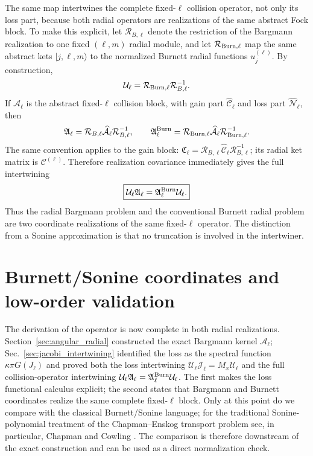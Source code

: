 \documentclass[11pt]{article}
\numberwithin{equation}{section}
\theoremstyle{definition}
\begin{document}
The same map intertwines the complete fixed-$\ell$ collision operator, not
only its loss part, because both radial operators are realizations of the same
abstract Fock block.  To make this explicit, let
$\mathcal R_{B,\ell}$ denote the restriction of the Bargmann realization to
one fixed $(\ell,m)$ radial module, and let $\mathcal R_{{\rm Burn},\ell}$
map the same abstract kets $|j,\ell,m\rangle$ to the normalized Burnett radial
functions $u_j^{(\ell)}$.  By construction,
\begin{equation}
 \mathcal U_\ell
 =\mathcal R_{{\rm Burn},\ell}\mathcal R_{B,\ell}^{-1}.
 \label{eq:U_as_change_of_realization}
\end{equation}
If $\widehat{\mathcal A}_\ell$ is the abstract fixed-$\ell$ collision block,
with gain part $\widehat{\mathcal C}_\ell$ and loss part
$\widehat{\mathcal N}_\ell$, then
\begin{equation}
 \mathfrak A_\ell
 =\mathcal R_{B,\ell}\widehat{\mathcal A}_\ell
  \mathcal R_{B,\ell}^{-1},
 \qquad
 \mathfrak A_\ell^{\rm Burn}
 =\mathcal R_{{\rm Burn},\ell}\widehat{\mathcal A}_\ell
  \mathcal R_{{\rm Burn},\ell}^{-1}.
 \label{eq:two_radial_realizations}
\end{equation}
The same convention applies to the gain block:
$\mathfrak C_\ell=\mathcal R_{B,\ell}\widehat{\mathcal C}_\ell
\mathcal R_{B,\ell}^{-1}$; its radial ket matrix is
$\mathcal C^{(\ell)}$.
Therefore realization covariance immediately gives the full intertwining
\begin{equation}
 \boxed{
 \mathcal U_\ell\mathfrak A_\ell
 =\mathfrak A_\ell^{\rm Burn}\mathcal U_\ell.
 }
 \label{eq:full_radial_intertwining}
\end{equation}
Thus the radial Bargmann problem and the conventional Burnett radial problem
are two coordinate realizations of the same fixed-$\ell$ operator.  The
distinction from a Sonine approximation is that no truncation is involved in
the intertwiner.


\section{Burnett/Sonine coordinates and low-order validation}
\label{sec:burnett_validation}

The derivation of the operator is now complete in both radial realizations.
Section~\ref{sec:angular_radial} constructed the exact Bargmann kernel
$\mathscr A_\ell$; Sec.~\ref{sec:jacobi_intertwining} identified the loss as the
spectral function $\kappa\pi G(J_\ell)$ and proved both the loss intertwining
$\mathcal U_\ell\mathcal J_\ell=M_x\mathcal U_\ell$ and the full collision-operator
intertwining
$\mathcal U_\ell\mathfrak A_\ell=\mathfrak A_\ell^{\rm Burn}\mathcal U_\ell$.
The first makes the loss functional calculus explicit; the second states that
Bargmann and Burnett coordinates realize the same complete fixed-$\ell$ block.
Only at this point do
we compare with the classical Burnett/Sonine language; for the traditional
Sonine-polynomial treatment of the Chapman--Enskog transport problem see, in
particular, Chapman and Cowling \cite{ChapmanCowling1970}.  The comparison is
therefore downstream of the exact construction and can be used as a direct
normalization check.
\end{document}
